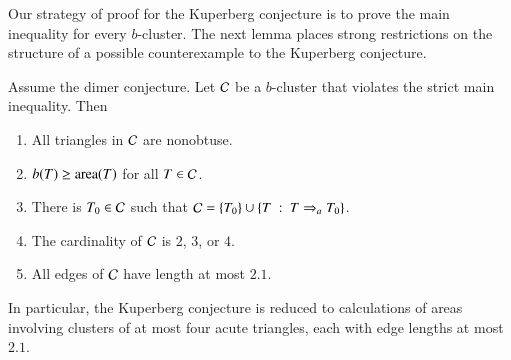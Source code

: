 Our strategy of proof for the Kuperberg conjecture is to prove the
main inequality for every $b$-cluster.  The next lemma places strong
restrictions on the structure of a possible counterexample to the
Kuperberg conjecture.

\begin{lemma}\label{lemma:props}  
  Assume the dimer conjecture.  Let $\mathcal C$ be a $b$-cluster that
  violates the strict main inequality.  Then
\begin{enumerate}
\item All triangles in $\mathcal C$ are nonobtuse.
\item $b(T) \ge {\operatorname{area}}(T)$ for all $T\in \mathcal C$.  
\item There is $T_0\in \mathcal C$ such that $\mathcal C = \{T_0\}\cup \{T \ :\ 
  T\Rightarrow_{a} T_0\}$.
\item The cardinality of $\mathcal C$ is $2$, $3$, or $4$.
\item All edges of $\mathcal C$ have length at most $2.1$.
\end{enumerate}
\end{lemma}

In particular, the Kuperberg conjecture is reduced to calculations of
areas involving clusters of at most four acute triangles, each with
edge lengths at most $2.1$.

